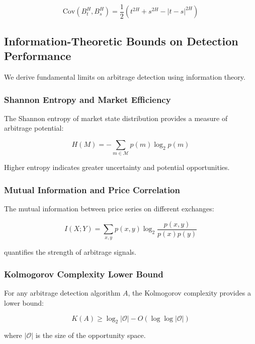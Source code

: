 \documentclass[12pt]{article}
\begin{document}
\begin{equation}
\text{Cov}(B_t^H, B_s^H) = \frac{1}{2}(t^{2H} + s^{2H} - |t-s|^{2H})
\end{equation}

\subsection{Information-Theoretic Bounds on Detection Performance}

We derive fundamental limits on arbitrage detection using information theory.

\subsubsection{Shannon Entropy and Market Efficiency}

The Shannon entropy of market state distribution provides a measure of arbitrage potential:

\begin{equation}
H(M) = -\sum_{m \in \mathcal{M}} p(m) \log_2 p(m)
\end{equation}

Higher entropy indicates greater uncertainty and potential opportunities.

\subsubsection{Mutual Information and Price Correlation}

The mutual information between price series on different exchanges:

\begin{equation}
I(X;Y) = \sum_{x,y} p(x,y) \log_2 \frac{p(x,y)}{p(x)p(y)}
\end{equation}

quantifies the strength of arbitrage signals.

\subsubsection{Kolmogorov Complexity Lower Bound}

For any arbitrage detection algorithm $A$, the Kolmogorov complexity provides a lower bound:

\begin{equation}
K(A) \geq \log_2 |\mathcal{O}| - O(\log \log |\mathcal{O}|)
\end{equation}

where $|\mathcal{O}|$ is the size of the opportunity space.
\end{document}
